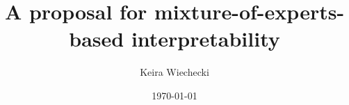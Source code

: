 \documentclass{article}
\date{\today}
\title{A proposal for mixture-of-experts-based interpretability}
\author[1]{Keira Wiechecki}
\affil[1]{Wakaru, \texttt{kaw504@nyu.edu}}
\begin{document}
\maketitle

\begin{abstract}
  
\end{abstract}



\printbibliography

%
\end{document}
